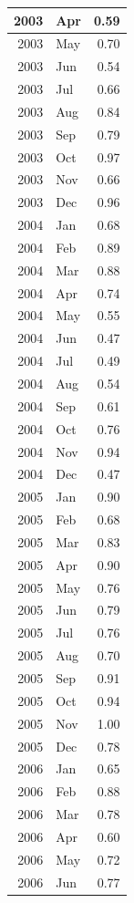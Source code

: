 \documentclass[
]{article}
\begin{document}
\begin{table}[H]
\begin{tabular}[t]{r|l|r}
\hline
2003 & Apr & 0.59\\
\hline
2003 & May & 0.70\\
\hline
2003 & Jun & 0.54\\
\hline
2003 & Jul & 0.66\\
\hline
2003 & Aug & 0.84\\
\hline
2003 & Sep & 0.79\\
\hline
2003 & Oct & 0.97\\
\hline
2003 & Nov & 0.66\\
\hline
2003 & Dec & 0.96\\
\hline
2004 & Jan & 0.68\\
\hline
2004 & Feb & 0.89\\
\hline
2004 & Mar & 0.88\\
\hline
2004 & Apr & 0.74\\
\hline
2004 & May & 0.55\\
\hline
2004 & Jun & 0.47\\
\hline
2004 & Jul & 0.49\\
\hline
2004 & Aug & 0.54\\
\hline
2004 & Sep & 0.61\\
\hline
2004 & Oct & 0.76\\
\hline
2004 & Nov & 0.94\\
\hline
2004 & Dec & 0.47\\
\hline
2005 & Jan & 0.90\\
\hline
2005 & Feb & 0.68\\
\hline
2005 & Mar & 0.83\\
\hline
2005 & Apr & 0.90\\
\hline
2005 & May & 0.76\\
\hline
2005 & Jun & 0.79\\
\hline
2005 & Jul & 0.76\\
\hline
2005 & Aug & 0.70\\
\hline
2005 & Sep & 0.91\\
\hline
2005 & Oct & 0.94\\
\hline
2005 & Nov & 1.00\\
\hline
2005 & Dec & 0.78\\
\hline
2006 & Jan & 0.65\\
\hline
2006 & Feb & 0.88\\
\hline
2006 & Mar & 0.78\\
\hline
2006 & Apr & 0.60\\
\hline
2006 & May & 0.72\\
\hline
2006 & Jun & 0.77\\

\end{tabular}
\end{table}
\end{document}
